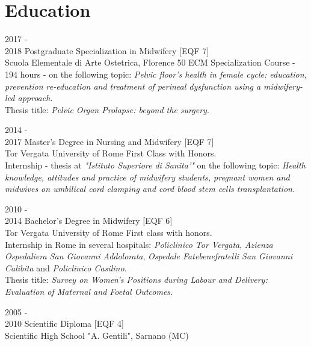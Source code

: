 \documentclass[11pt]{friggeri-cv}
\begin{document}
\vspace{-10pt}
\section{Education}
\begin{entrylist}
  \entry
  {2017 - \\2018}
  {Postgraduate Specialization in Midwifery [\small EQF 7]}
  {\\Scuola Elementale di Arte Ostetrica, Florence}
  {50 ECM Specialization Course - 194 hours - on the following topic: 
  \emph{Pelvic floor's health in female cycle: education, prevention 
  re-education and treatment of perineal dysfunction using a midwifery-led 
  approach.}\\
  Thesis title: \emph{Pelvic Organ Prolapse: beyond the surgery}.\\}
  
  \entry
  {2014 - \\2017}
  {Master's Degree in Nursing and Midwifery [\small EQF 7]}
  {\\Tor Vergata University of Rome}
  {First Class with Honors. \\Internship - thesis at \textit{"Istituto 
  Superiore di Sanita'"} on the following topic: \textit{Health knowledge, 
  attitudes and practice of midwifery students, pregnant women and midwives on 
  umbilical cord clamping and cord blood stem cells transplantation.}\\}
  
  \entry
  {2010 - \\2014}
  {Bachelor's Degree in Midwifery [\small EQF 6]}
  {\\Tor Vergata University of Rome}
  {First class with honors.\\
  Internship in Rome in several hospitals: \textit{Policlinico Tor Vergata}, 
  \textit{Azienza Ospedaliera San Giovanni Addolorata}, \textit{Ospedale 
  Fatebenefratelli San Giovanni Calibita} and \textit{Policlinico Casilino}.\\
  Thesis title: \textit{Survey on Women's Positions during Labour and Delivery: 
  Evaluation of Maternal and Foetal Outcomes.}\\}
  
  \entry
  {2005 - \\2010}
  {Scientific Diploma [\small EQF 4]}
  {\\Scientific High School "A. Gentili", Sarnano (MC)}
  {}
\end{entrylist}
\end{document}
